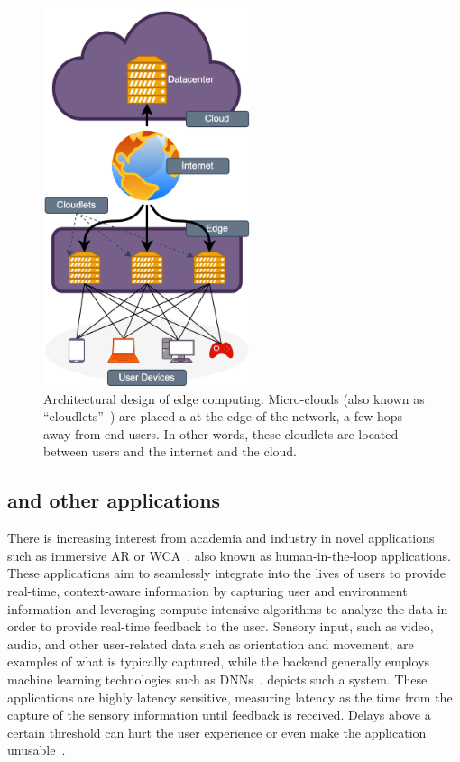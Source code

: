 \begin{figure}
    \centering
    \includegraphics[height=30em]{Figs/edgecomputing}
    \caption{%
        Architectural design of edge computing.
        Micro-clouds (also known as ``cloudlets''~\cite{satyanarayanan2009case}) are placed a at the edge of the network, a few hops away from end users.
        In other words, these cloudlets are located between users and the internet and the cloud.
    }\label{fig:edgecomputing}
\end{figure}


\subsection{ and other  applications}

There is increasing interest from academia and industry in novel applications such as immersive \gls{AR} or \gls{WCA}~\cite{chatzopoulos2017hyperion,ha2014towards}, also known as human-in-the-loop applications.
These applications aim to seamlessly integrate into the lives of users to provide real-time, context-aware information by capturing user and environment information and leveraging compute-intensive algorithms to analyze the data in order to provide real-time feedback to the user.
Sensory input, such as video, audio, and other user-related data such as orientation and movement, are examples of what is typically captured, while the backend generally employs machine learning technologies such as \glspl{DNN}~\cite{ha2014towards}.
 depicts such a system.
These applications are highly latency sensitive, measuring latency as the time from the capture of the sensory information until feedback is received.
Delays above a certain threshold can hurt the user experience or even make the application unusable~\cite{chen2017empirical}.

